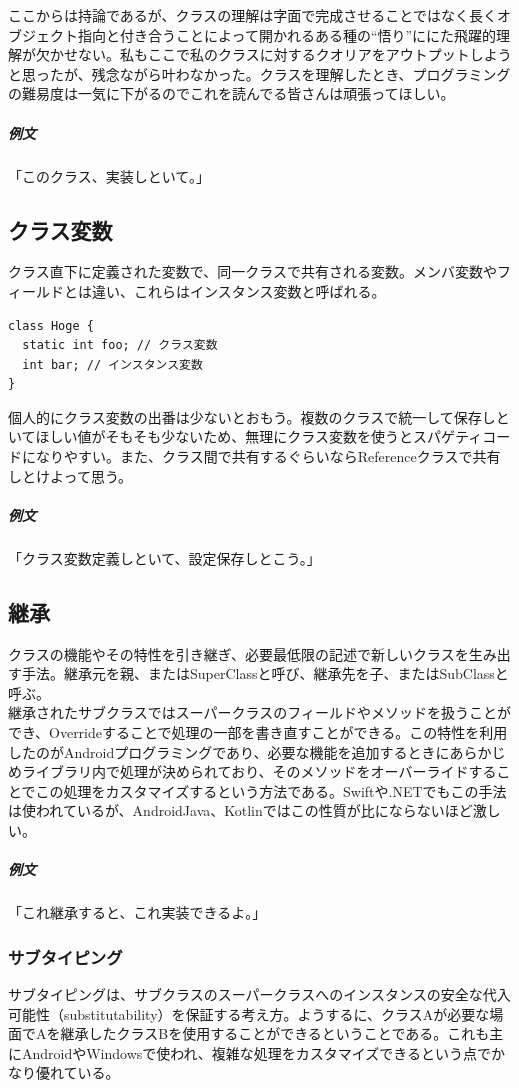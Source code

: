 \documentclass[a4paper]{ltjsreport}
\begin{document}
ここからは持論であるが、クラスの理解は字面で完成させることではなく長くオブジェクト指向と付き合うことによって開かれるある種の``悟り''ににた飛躍的理解が欠かせない。私もここで私のクラスに対するクオリアをアウトプットしようと思ったが、残念ながら叶わなかった。クラスを理解したとき、プログラミングの難易度は一気に下がるのでこれを読んでる皆さんは頑張ってほしい。

\subparagraph{例文} 「このクラス、実装しといて。」

\subsection{クラス変数}
クラス直下に定義された変数で、同一クラスで共有される変数。メンバ変数やフィールドとは違い、これらはインスタンス変数と呼ばれる。

\lstset{language=Java}
\begin{lstlisting}[caption=Javaにおけるクラス変数とインスタンス変数のちがい]
class Hoge {
  static int foo; // クラス変数
  int bar; // インスタンス変数
}
\end{lstlisting}

個人的にクラス変数の出番は少ないとおもう。複数のクラスで統一して保存しといてほしい値がそもそも少ないため、無理にクラス変数を使うとスパゲティコードになりやすい。また、クラス間で共有するぐらいならReferenceクラスで共有しとけよって思う。

\subparagraph{例文} 「クラス変数定義しといて、設定保存しとこう。」

\subsection{継承}
クラスの機能やその特性を引き継ぎ、必要最低限の記述で新しいクラスを生み出す手法。継承元を親、またはSuperClassと呼び、継承先を子、またはSubClassと呼ぶ。
\\

継承されたサブクラスではスーパークラスのフィールドやメソッドを扱うことができ、Overrideすることで処理の一部を書き直すことができる。この特性を利用したのがAndroidプログラミングであり、必要な機能を追加するときにあらかじめライブラリ内で処理が決められており、そのメソッドをオーバーライドすることでこの処理をカスタマイズするという方法である。Swiftや.NETでもこの手法は使われているが、AndroidJava、Kotlinではこの性質が比にならないほど激しい。

\subparagraph{例文} 「これ継承すると、これ実装できるよ。」

\subsubsection {サブタイピング}
サブタイピングは、サブクラスのスーパークラスへのインスタンスの安全な代入可能性（substitutability）を保証する考え方。ようするに、クラスAが必要な場面でAを継承したクラスBを使用することができるということである。これも主にAndroidやWindowsで使われ、複雑な処理をカスタマイズできるという点でかなり優れている。
\end{document}
